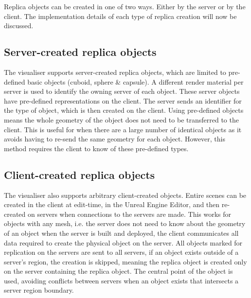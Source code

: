 Replica objects can be created in one of two ways. Either by the server or by the client. The implementation details of each type of replica creation will now be discussed.

\subsection{Server-created replica objects}\label{Server-CreatedReplicas}
The visualiser supports server-created replica objects, which are limited to pre-defined basic objects (cuboid, sphere \& capsule). A different render material per server is used to identify the owning server of each object. These server objects have pre-defined representations on the client. The server sends an identifier for the type of object, which is then created on the client. Using pre-defined objects means the whole geometry of the object does not need to be transferred to the client. This is useful for when there are a large number of identical objects as it avoids having to re-send the same geometry for each object. However, this method requires the client to know of these pre-defined types.

\subsection{Client-created replica objects}
The visualiser also supports arbitrary client-created objects. Entire scenes can be created in the client at edit-time, in the Unreal Engine Editor, and then re-created on servers when connections to the servers are made. This works for objects with any mesh, i.e. the server does not need to know about the geometry of an object when the server is built and deployed, the client communicates all data required to create the physical object on the server. All objects marked for replication on the servers are sent to all servers, if an object exists outside of a server's region, the creation is skipped, meaning the replica object is created only on the server containing the replica object. The central point of the object is used, avoiding conflicts between servers when an object exists that intersects a server region boundary.

